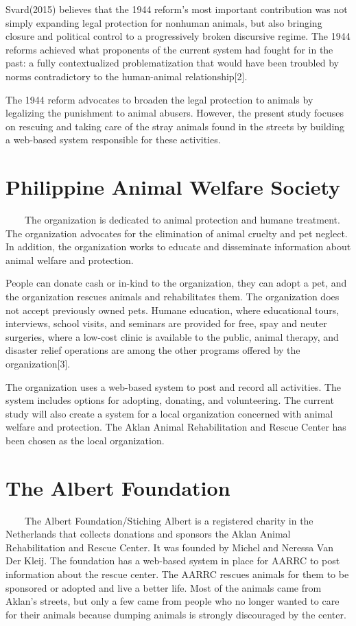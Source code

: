 Svard(2015) believes that the 1944 reform's most important contribution was not simply expanding legal protection for nonhuman animals, but also bringing closure and political control to a progressively broken discursive regime. The 1944 reforms achieved what proponents of the current system had fought for in the past: a fully contextualized problematization that would have been troubled by norms contradictory to the human-animal relationship[2].

The 1944 reform advocates to broaden the legal protection to animals by legalizing the punishment to animal abusers. However, the present study focuses on rescuing and taking care of the stray animals found in the streets by building a web-based system responsible for these activities.


\section{Philippine Animal Welfare Society}

~~~~The organization is dedicated to animal protection and humane treatment. The organization advocates for the elimination of animal cruelty and pet neglect. In addition, the organization works to educate and disseminate information about animal welfare and protection.

People can donate cash or in-kind to the organization, they can adopt a pet, and the organization rescues animals and rehabilitates them. The organization does not accept previously owned pets.
Humane education, where educational tours, interviews, school visits, and seminars are provided for free, spay and neuter surgeries, where a low-cost clinic is available to the public, animal therapy, and disaster relief operations are among the other programs offered by the organization[3].

The organization uses a web-based system to post and record all activities. The system includes options for adopting, donating, and volunteering. The current study will also create a system for a local organization concerned with animal welfare and protection. The Aklan Animal Rehabilitation and Rescue Center has been chosen as the local organization.

\section{The Albert Foundation}

~~~~The Albert Foundation/Stiching Albert is a registered charity in the Netherlands that collects donations and sponsors the Aklan Animal Rehabilitation and Rescue Center. It was founded by Michel and Neressa Van Der Kleij. The foundation has a web-based system in place for AARRC to post information about the rescue center. The AARRC rescues animals for them to be sponsored or adopted and live a better life. Most of the animals came from Aklan's streets, but only a few came from people who no longer wanted to care for their animals because dumping animals is strongly discouraged by the center.

